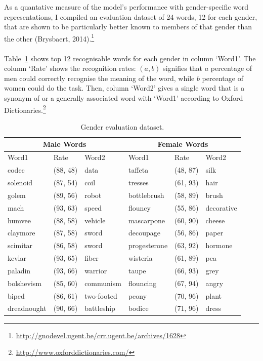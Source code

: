 \documentclass[a4paper,12pt,twoside,openright]{report}
\begin{document}
As a quantative measure of the model's performance with gender-specific word representations, I compiled an evaluation dataset of 24 words, 12 for each gender, that are shown to be particularly better known to members of that gender than the other (Brysbaert, 2014).\footnote{\url{http://gnodevel.ugent.be/crr.ugent.be/archives/1628}}
\\ \\
Table~\ref{tab:chap5:gender} shows top 12 recognisable words for each gender in column `Word1'. The column `Rate' shows the recognition rates: $(a, b)$ signifies that $a$ percentage of men could correctly recognise the meaning of the word, while $b$ percentage of women could do the task. Then, column `Word2' gives a single word that is a synonym of or a generally associated word with `Word1' according to Oxford Dictionaries.\footnote{\url{http://www.oxforddictionaries.com/}}

\begin{table}[htbp]
\begin{center}
\begin{tabular}{ lll|lll }
    \multicolumn{3}{c}{Male Words}  & \multicolumn{3}{c}{Female Words}  \\ \hline
    Word1 & Rate & Word2 & Word1 & Rate & Word2 \\ \hline
    codec & (88, 48) & data & taffeta & (48, 87) & silk  \\
    solenoid & (87, 54) & coil & tresses & (61, 93) & hair \\
    golem & (89, 56) & robot & bottlebrush & (58, 89) & brush \\
    mach & (93, 63) & speed & flouncy & (55, 86) & decorative \\
    humvee & (88, 58) & vehicle & mascarpone & (60, 90)& cheese  \\
    claymore & (87, 58) & sword & decoupage & (56, 86) & paper \\
    scimitar & (86, 58) & sword & progesterone & (63, 92) & hormone\\
    kevlar & (93, 65) & fiber & wisteria & (61, 89) & pea \\
    paladin & (93, 66) & warrior & taupe & (66, 93) & grey \\
    bolshevism & (85, 60) & communism & flouncing & (67, 94) & angry \\
    biped & (86, 61) & two-footed & peony & (70, 96) & plant \\
    dreadnought & (90, 66) & battleship& bodice & (71, 96) & dress\\
    \hline
\end{tabular}
\end{center}
\caption{Gender evaluation dataset.}
\vspace{-0.1cm}
\label{tab:chap5:gender}
\end{table}
\end{document}
